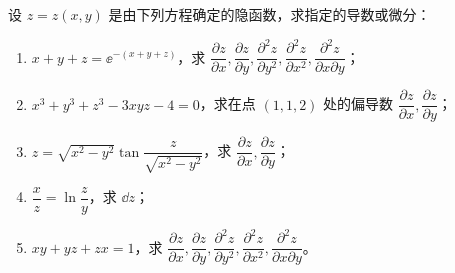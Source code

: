 \begin{xexercise}[3]
设 $z=z(x,y)$ 是由下列方程确定的隐函数，求指定的导数或微分：
  \begin{enumerate}[label=(\arabic*)]
    \item $x+y+z=\ee^{-(x+y+z)}$，求 $\dfrac{\partial z}{\partial x},\dfrac{\partial z}{\partial y},\dfrac{\partial^2z}{\partial y^2},\dfrac{\partial^2z}{\partial x^2},\dfrac{\partial^2z}{\partial x\partial y}$；
    \item $x^3+y^3+z^3-3xyz-4=0$，求在点 $(1,1,2)$ 处的偏导数 $\dfrac{\partial z}{\partial x},\dfrac{\partial z}{\partial y}$；
    \item $z=\sqrt{x^2-y^2}\tan\dfrac{z}{\sqrt{x^2-y^2}}$，求 $\dfrac{\partial z}{\partial x},\dfrac{\partial z}{\partial y}$；
    \item $\dfrac{x}{z}=\ln\dfrac{z}{y}$，求 $\dd z$；
    \item $xy+yz+zx=1$，求 $\dfrac{\partial z}{\partial x},\dfrac{\partial z}{\partial y},\dfrac{\partial^2z}{\partial y^2},\dfrac{\partial^2z}{\partial x^2},\dfrac{\partial^2z}{\partial x\partial y}$。
  \end{enumerate}
\end{xexercise}
